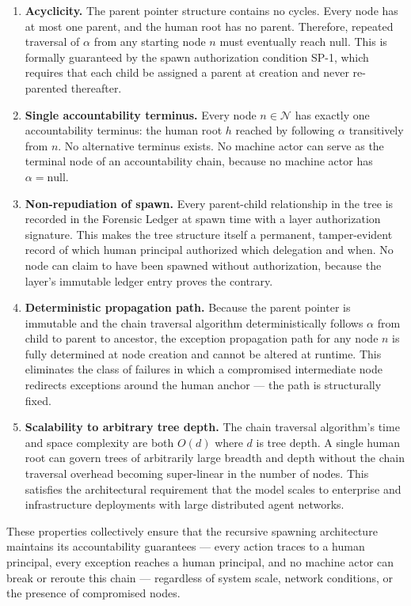 \begin{enumerate}
\item[$\mathbf{P_1}$] \textbf{Acyclicity.} The parent pointer structure contains no cycles. Every node has at most one parent, and the human root has no parent. Therefore, repeated traversal of $\alpha$ from any starting node $n$ must eventually reach null. This is formally guaranteed by the spawn authorization condition SP-1, which requires that each child be assigned a parent at creation and never re-parented thereafter.

\item[$\mathbf{P_2}$] \textbf{Single accountability terminus.} Every node $n \in \mathcal{N}$ has exactly one accountability terminus: the human root $h$ reached by following $\alpha$ transitively from $n$. No alternative terminus exists. No machine actor can serve as the terminal node of an accountability chain, because no machine actor has $\alpha = \text{null}$.

\item[$\mathbf{P_3}$] \textbf{Non-repudiation of spawn.} Every parent-child relationship in the tree is recorded in the Forensic Ledger at spawn time with a \purpose{} layer authorization signature. This makes the tree structure itself a permanent, tamper-evident record of which human principal authorized which delegation and when. No node can claim to have been spawned without authorization, because the \fact{} layer's immutable ledger entry proves the contrary.

\item[$\mathbf{P_4}$] \textbf{Deterministic propagation path.} Because the parent pointer is immutable and the chain traversal algorithm deterministically follows $\alpha$ from child to parent to ancestor, the exception propagation path for any node $n$ is fully determined at node creation and cannot be altered at runtime. This eliminates the class of failures in which a compromised intermediate node redirects exceptions around the human anchor — the path is structurally fixed.

\item[$\mathbf{P_5}$] \textbf{Scalability to arbitrary tree depth.} The chain traversal algorithm's time and space complexity are both $O(d)$ where $d$ is tree depth. A single human root can govern trees of arbitrarily large breadth and depth without the chain traversal overhead becoming super-linear in the number of nodes. This satisfies the architectural requirement that the \bxthree{} model scales to enterprise and infrastructure deployments with large distributed agent networks.
\end{enumerate}

These properties collectively ensure that the \bxthree{} recursive spawning architecture maintains its accountability guarantees — every action traces to a human principal, every exception reaches a human principal, and no machine actor can break or reroute this chain — regardless of system scale, network conditions, or the presence of compromised nodes.